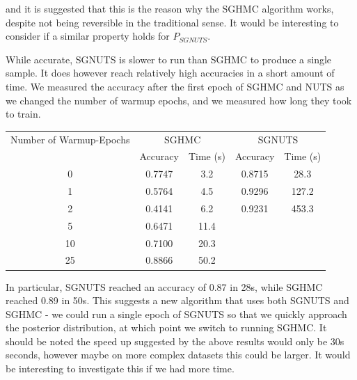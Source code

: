 and it is suggested that this is the reason why the SGHMC algorithm works, despite not being reversible in the traditional sense. It would be interesting to consider if a similar property holds for $P_{SGNUTS}$.

While accurate, SGNUTS is slower to run than SGHMC to produce a single sample. It does however reach relatively high accuracies in a short amount of time. We measured the accuracy after the first epoch of SGHMC and NUTS as we changed the number of warmup epochs, and we measured how long they took to train.

\begin{center}
\begin{tabular}{ccccc} 
\hline
Number of Warmup-Epochs &\multicolumn{2}{c}{SGHMC}& \multicolumn{2}{c}{SGNUTS} \\
& Accuracy & Time (s) & Accuracy & Time (s) \\
 \hline
 0 &0.7747  &  3.2&0.8715&28.3\\ 
 1 & 0.5764 & 4.5 &0.9296&127.2\\ 
 2 & 0.4141 & 6.2&0.9231&453.3\\ 
 5 &0.6471& 11.4 &&\\ 
 10 &0.7100& 20.3 &&\\ 
 25 &0.8866& 50.2 &&\\ 
 \hline
\end{tabular}
\end{center}

In particular, SGNUTS reached an accuracy of 0.87 in 28s, while SGHMC reached 0.89 in 50s. This suggests a new algorithm that uses both SGNUTS and SGHMC - we could run a single epoch of SGNUTS so that we quickly approach the posterior distribution, at which point we switch to running SGHMC. It should be noted the speed up suggested by the above results would only be 30s seconds, however maybe on more complex datasets this could be larger. It would be interesting to investigate this if we had more time.